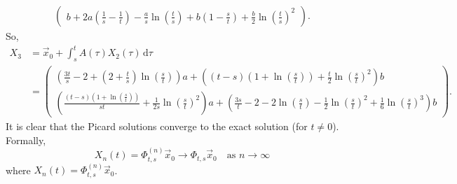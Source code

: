 \documentclass{exam}
\begin{document}
\begin{solution}
\begin{align*}
\begin{pmatrix}
            b + 2a\left(\frac{1}{s} - \frac{1}{t} \right) - \frac{a}{s}\ln\left(\frac{t}{s}\right) + b\left(1 - \frac{s}{t}\right) + \frac{b}{2}\ln\left(\frac{t}{s}\right)^2
        \end{pmatrix}.
    \end{align*}
    So, 
    \begin{align*}
        X_3 &= \vec{x}_0 + \int_s^t A(\tau)X_2(\tau)\,\mathrm{d}\tau \\
        &= \begin{pmatrix}
            \left(\frac{3t}{s} - 2 + \left(2 + \frac{t}{s}\right)\ln\left(\frac{s}{t}\right)\right)a + \left((t-s)\left(1 + \ln\left(\frac{s}{t}\right)\right) + \frac{t}{2}\ln\left(\frac{s}{t}\right)^2\right)b \\
            \left(\frac{(t-s)\left(1 + \ln\left(\frac{s}{t}\right)\right)}{st} + \frac{1}{2s}\ln\left(\frac{s}{t}\right)^2\right)a + \left(\frac{3s}{t} - 2 - 2\ln\left(\frac{s}{t}\right) - \frac{1}{2}\ln\left(\frac{s}{t}\right)^2 + \frac{1}{6}\ln\left(\frac{s}{t}\right)^3\right)b
        \end{pmatrix}.
    \end{align*}
    It is clear that the Picard solutions converge to the exact solution (for $t \neq 0$). Formally, 
    \[
        X_n(t) = \Phi_{t,s}^{(n)}\vec{x}_0 \to \Phi_{t,s}\vec{x}_0 \quad \text{as } n \to \infty 
    \]
    where $X_n(t) = \Phi_{t, s}^{(n)}\vec{x}_0$.
\end{solution}
\end{document}
